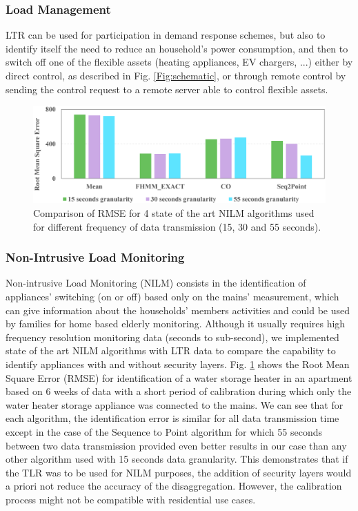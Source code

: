 \documentclass[conference]{IEEEtran}
\begin{document}
\subsubsection{Load Management}
LTR can be used for participation in demand response schemes, but also to identify itself the need to reduce an household's power consumption, and then to switch off one of the flexible assets (heating appliances, EV chargers, ...) either by direct control, as described in Fig. \ref{Fig:schematic}, or through remote control by sending the control request to a remote server able to control flexible assets.


\begin{figure}[h]
\centering
\includegraphics[width=0.85\columnwidth]{Images/NILMComparison}
\caption{Comparison of  RMSE for 4 state of the art NILM algorithms used for different frequency of data transmission (15, 30 and 55 seconds).}
\label{Fig:NILMComparison}
\end{figure}

\subsubsection{Non-Intrusive Load Monitoring}
\label{section:NILM}
Non-intrusive Load Monitoring (NILM) consists in the identification of appliances' switching (on or off) based only on the mains' measurement, which can give information about the households' members activities and could be used by families for home based elderly monitoring. Although it usually requires high frequency resolution monitoring data (seconds to sub-second), we implemented state of the art NILM algorithms with LTR data to compare the capability to identify appliances with and without security layers.  Fig. \ref{Fig:NILMComparison} shows the Root Mean Square Error (RMSE) for identification of a water storage heater in an apartment based on 6 weeks of data with a short period of calibration during which only the water heater storage appliance was connected to the mains.  We can see that for each algorithm, the identification error is similar for all data transmission time except in the case of the Sequence to Point algorithm for which 55 seconds between two data transmission provided even better results in our case than any other algorithm used with 15 seconds data granularity. This demonstrates that if the TLR was to be used for NILM purposes, the addition of security layers would a priori not reduce the accuracy of the disaggregation. However, the calibration process might not be compatible with residential use cases.
\end{document}

